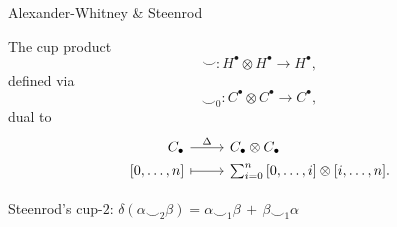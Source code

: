 \documentclass[10pt,t, handout]{beamer} %
\begin{document}
\begin{frame}{Alexander-Whitney \& Steenrod}
	
	
	\vskip -5pt
	The cup product
	\begin{equation*}
	\smallsmile \colon H^\bullet \otimes H^\bullet \to H^\bullet,
	\end{equation*}
	\vskip -9pt
	defined via
	\vskip -9pt
	\begin{equation*}
	\smallsmile_0 \colon C^\bullet \otimes C^\bullet \to C^\bullet,
	\end{equation*}
	dual to 
	\begin{equation*}
	\begin{tikzcd}[
	,row sep = 0ex
	,/tikz/column 1/.append style={anchor=base east}
	,/tikz/column 2/.append style={anchor=base west}
	]
	C_\bullet \arrow[r, "\Delta"] & C_\bullet \otimes C_\bullet \\
	{[0, \dots, n]} \arrow[r, |->] & \sum_{i=0}^{n} {[0, \dots, i] \otimes [i, \dots, n]}.
	\end{tikzcd}
	\end{equation*}
	
	\vskip 15pt
	
	\textcolor{pblue}{Steenrod's cup-$2$:} \quad
	$\delta(\alpha \smallsmile_2 \beta) = \alpha \smallsmile_1 \beta\, +\, \beta \smallsmile_1 \alpha$
\end{frame}
\end{document}
